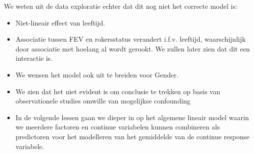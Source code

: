 \documentclass[
]{article}
\providecommand{\tightlist}{%
  \setlength{\itemsep}{0pt}\setlength{\parskip}{0pt}}
\begin{document}
We weten uit de data exploratie echter dat dit nog niet het correcte
model is:

\begin{itemize}
\tightlist
\item
  Niet-lineair effect van leeftijd.
\item
  Associatie tussen FEV en rokersstatus verandert i.f.v. leeftijd,
  waarschijnlijk door associatie met hoelang al wordt gerookt. We zullen
  later zien dat dit een interactie is.
\item
  We wensen het model ook uit te breiden voor Gender.
\item
  We zien dat het niet evident is om conclusie te trekken op basis van
  observationele studies omwille van mogelijkse confounding
\item
  In de volgende lessen gaan we dieper in op het algemene lineair model
  waarin we meerdere factoren en continue variabelen kunnen combineren
  als predictoren voor het modelleren van het gemiddelde van de continue
  response variabele.
\end{itemize}
\end{document}
